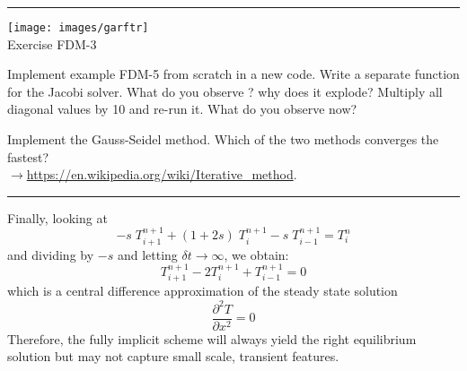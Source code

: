 \begin{center}
\begin{minipage}[t]{0.77\textwidth}
\par\noindent\rule{\textwidth}{0.4pt}

\begin{center}
\texttt{[image: images/garftr]} \\
{\color{orange}Exercise FDM-3}
\end{center}

Implement example FDM-5 from scratch in a new code.
Write a separate function for the Jacobi solver.
What do you observe ? why does it explode? 
Multiply all diagonal values by 10 and re-run it. 
What do you observe now? 

Implement the Gauss-Seidel method.
Which of the two methods converges the fastest?\\
$\rightarrow$\url{https://en.wikipedia.org/wiki/Iterative_method}. 
\par\noindent\rule{\textwidth}{0.4pt}
\end{minipage}
\end{center}


\noindent
Finally, looking at
\begin{equation}
-s\;  T_{i+1}^{n+1} + (1+2s)\;  T_{i}^{n+1} - s\;  T_{i-1}^{n+1} = T_i^{n}
\end{equation}
and dividing by $-s$ and letting $\delta t \rightarrow \infty$, we obtain:
\begin{equation}
T_{i+1}^{n+1} -2 T_{i}^{n+1} + T_{i-1}^{n+1} = 0
\end{equation}
which is a central difference approximation of the steady state solution
\begin{equation}
\frac{\partial^2 T }{\partial x^2}=0
\end{equation}
Therefore, the fully implicit scheme will always yield the right equilibrium solution 
but may not capture small scale, transient features.


